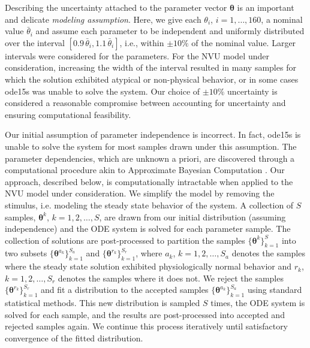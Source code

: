 \documentclass[smallextended]{svjour3}
\numberwithin{equation}{section}
\begin{document}
Describing the uncertainty attached to the parameter vector $\boldsymbol{\theta}$ is an important and delicate {\sl modeling assumption}. Here, we give each $\theta_i$, $i=1,\dots, 160$, a nominal value $\bar \theta_i$ and assume each parameter to be independent and uniformly distributed over the interval $[0.9\, \bar\theta_i, 1.1 \,\bar\theta_i]$, i.e., within $\pm 10\%$ of the nominal value. Larger intervals were considered for the parameters. For the NVU model under consideration, increasing the width of the interval resulted in many samples for which the solution exhibited atypical or non-physical behavior, or in some cases ode15s was unable to solve the system. Our choice of $\pm 10\%$ uncertainty is considered a reasonable compromise between accounting for uncertainty and ensuring computational feasibility. 
	
Our initial assumption of parameter independence is incorrect. In fact, ode15s is unable to solve the system for most samples drawn under this assumption. The parameter dependencies, which are unknown a priori, are discovered through a computational procedure akin to Approximate Bayesian Computation \cite{abc}. Our approach, described below, is computationally intractable when applied to the NVU model under consideration. We simplify the model by removing the stimulus, i.e. modeling the steady state behavior of the system. A collection of $S$ samples, $\boldsymbol{\theta}^k$, $k=1,2,\dots,S$, are drawn from our initial distribution (assuming independence) and the ODE system is solved for each parameter sample. The collection of solutions are post-processed to partition the samples $\{\boldsymbol{\theta}^k\}_{k=1}^S$ into two subsets $\{\boldsymbol{\theta}^{a_k}\}_{k=1}^{S_a}$ and $\{\boldsymbol{\theta}^{r_k}\}_{k=1}^{S_r}$, where $a_k$, $k=1,2,\dots,S_a$ denotes the samples where the steady state solution exhibited physiologically normal behavior and $r_k$, $k=1,2,\dots,S_r$ denotes the samples where it does not. We reject the samples $\{\boldsymbol{\theta}^{r_k}\}_{k=1}^{S_r}$ and fit a distribution to the accepted samples $\{\boldsymbol{\theta}^{a_k}\}_{k=1}^{S_a}$ using standard statistical methods. This new distribution is sampled $S$ times,  the ODE system is solved for each sample, and the results are post-processed into accepted and rejected samples again. We continue this process iteratively until satisfactory convergence of the fitted distribution.
\end{document}

